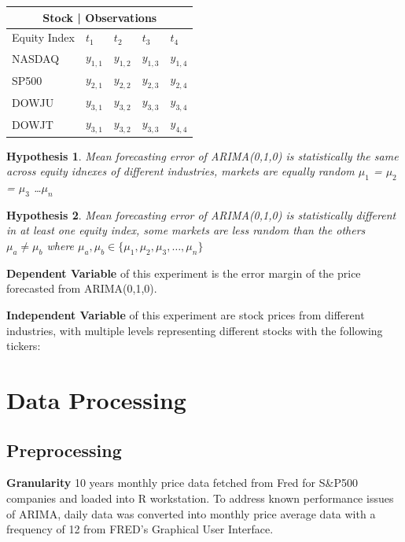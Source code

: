 \documentclass{article}[12pt]
\newtheorem*{hyp*}{Hypothesis \protect\hypnumber} %
\newenvironment{hyp}[1]{\renewcommand{\hypnumber}{#1}\begin{hyp*}}{\end{hyp*}}
\newcommand{\hypnumber}{}
\begin{document}
    \medskip
          \begin{center}
            \begin{tabular}{ |p{2cm}||p{2cm}|p{2cm}|p{2cm}|p{2cm}|}
                \hline
                \multicolumn{5}{|c|}{Stock | Observations} \\
                \hline
                Equity Index&$t_{1}$      &$t_{2}$    &$t_{3}$    &$t_{4}$    \\
                \hline
                NASDAQ      &$y_{1,1}$   &$y_{1,2}$  &$y_{1,3}$  &$y_{1,4}$  \\
                SP500       &$y_{2,1}$   &$y_{2,2}$  &$y_{2,3}$  &$y_{2,4}$  \\
                DOWJU       &$y_{3,1}$   &$y_{3,2}$  &$y_{3,3}$  &$y_{3,4}$  \\
                DOWJT       &$y_{3,1}$   &$y_{3,2}$  &$y_{3,3}$  &$y_{4,4}$  \\
                \hline
            \end{tabular}
    \end{center}

        \begin{hyp}{0} 
            Mean forecasting error of ARIMA(0,1,0) is statistically the same across equity idnexes of different industries, markets are equally random $\mu_{1}$ = $\mu_{2}$ = $\mu_{3}$ \dots $\mu_{n}$  
        \end{hyp}
        \begin{hyp}{1} 
            Mean forecasting error of ARIMA(0,1,0) is statistically different in at least one equity index, some markets are less random than the others $\mu_{a} \neq \mu_{b}$ where \( \mu_{a},\mu_{b} \in \{\mu_{1}, \mu_{2},\mu_{3}, \dots, \mu_{n} \} \)
        \end{hyp}

    
        \textbf{Dependent Variable} of this experiment is the error margin of the price forecasted from ARIMA(0,1,0). 
        \medskip

        \textbf{Independent Variable} of this experiment are stock prices from different industries, with multiple levels representing different stocks with the following tickers:

        \section{Data Processing}
            \subsection{Preprocessing}
                \textbf{Granularity} 10 years monthly price data fetched from Fred for S\&P500 companies and loaded into R workstation. To address known performance issues of ARIMA, daily data was converted into monthly price average data with a frequency of 12 from FRED's Graphical User Interface.
\end{document}

